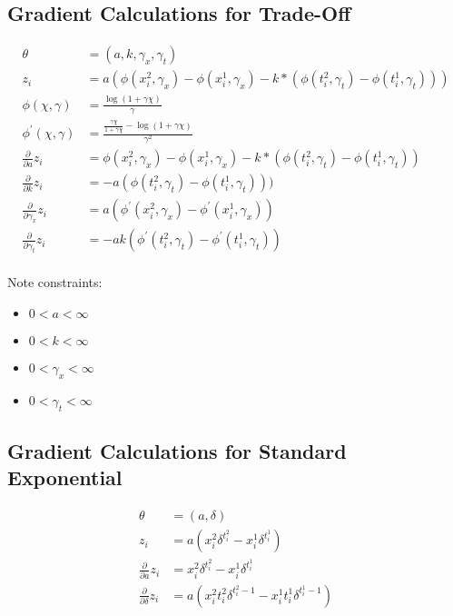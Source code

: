\documentclass[12pt]{article}
\begin{document}
\subsection{Gradient Calculations for Trade-Off}

\begin{align*}
\theta &= (a, k, \gamma_x, \gamma_t) \\
z_i &= a(
  \phi(x^2_i, \gamma_x) - \phi(x^1_i, \gamma_x)
  - k * (\phi(t^2_i, \gamma_t) - \phi(t^1_i, \gamma_t))
) \\
\phi(\chi, \gamma) &= \frac{\log(1 + \gamma \chi)}{\gamma} \\
\phi^{\prime}(\chi, \gamma)
  &= \frac{\frac{\gamma \chi}{1 + \gamma \chi} - \log(1 + \gamma \chi)}{\gamma^2} \\
\frac{\partial}{\partial a} z_i
  &= \phi(x^2_i, \gamma_x) - \phi(x^1_i, \gamma_x)
    - k * (\phi(t^2_i, \gamma_t) - \phi(t^1_i, \gamma_t)) \\
\frac{\partial}{\partial k} z_i
  &= -a (\phi(t^2_i, \gamma_t) - \phi(t^1_i, \gamma_t))) \\
\frac{\partial}{\partial \gamma_x} z_i
  &= a(\phi^{\prime}(x^2_i, \gamma_x) - \phi^{\prime}(x^1_i, \gamma_x)) \\
\frac{\partial}{\partial \gamma_t} z_i
  &= -a k (\phi^{\prime}(t^2_i, \gamma_t) - \phi^{\prime}(t^1_i, \gamma_t)) \\
\end{align*}

Note constraints:

\begin{itemize}
    \item{$0 < a < \infty$}
    \item{$0 < k < \infty$}
    \item{$0 < \gamma_x < \infty$}
    \item{$0 < \gamma_t < \infty$}
\end{itemize}

\subsection{Gradient Calculations for Standard Exponential}

\begin{align*}
  \theta &= (a, \delta) \\
  z_i &= a (x^2_i \delta^{t^2_i} - x^1_i \delta^{t^1_i}) \\
  \frac{\partial}{\partial a} z_i
    &= x^2_i \delta^{t^2_i} - x^1_i \delta^{t^1_i} \\
  \frac{\partial}{\partial \delta} z_i
    &= a (x^2_i t^2_i \delta^{t^2_i - 1} - x^1_i t^1_i \delta^{t^1_i - 1}) \\
\end{align*}
\end{document}
